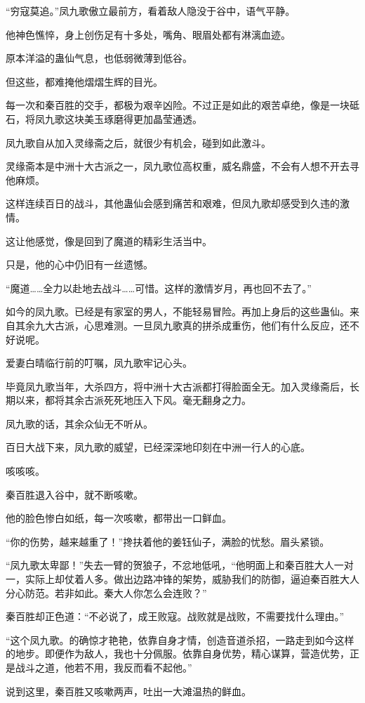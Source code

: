\begin{this_body}
“穷寇莫追。”凤九歌傲立最前方，看着敌人隐没于谷中，语气平静。

他神色憔悴，身上创伤足有十多处，嘴角、眼眉处都有淋漓血迹。

原本洋溢的蛊仙气息，也低弱微薄到低谷。

但这些，都难掩他熠熠生辉的目光。

每一次和秦百胜的交手，都极为艰辛凶险。不过正是如此的艰苦卓绝，像是一块砥石，将凤九歌这块美玉琢磨得更加晶莹通透。

凤九歌自从加入灵缘斋之后，就很少有机会，碰到如此激斗。

灵缘斋本是中洲十大古派之一，凤九歌位高权重，威名鼎盛，不会有人想不开去寻他麻烦。

这样连续百日的战斗，其他蛊仙会感到痛苦和艰难，但凤九歌却感受到久违的激情。

这让他感觉，像是回到了魔道的精彩生活当中。

只是，他的心中仍旧有一丝遗憾。

“魔道……全力以赴地去战斗……可惜。这样的激情岁月，再也回不去了。”

如今的凤九歌。已经是有家室的男人，不能轻易冒险。再加上身后的这些蛊仙。来自其余九大古派，心思难测。一旦凤九歌真的拼杀成重伤，他们有什么反应，还不好说呢。

爱妻白晴临行前的叮嘱，凤九歌牢记心头。

毕竟凤九歌当年，大杀四方，将中洲十大古派都打得脸面全无。加入灵缘斋后，长期以来，都将其余古派死死地压入下风。毫无翻身之力。

凤九歌的话，其余众仙无不听从。

百日大战下来，凤九歌的威望，已经深深地印刻在中洲一行人的心底。

咳咳咳。

秦百胜退入谷中，就不断咳嗽。

他的脸色惨白如纸，每一次咳嗽，都带出一口鲜血。

“你的伤势，越来越重了！”搀扶着他的姜钰仙子，满脸的忧愁。眉头紧锁。

“凤九歌太卑鄙！”失去一臂的贺狼子，不忿地低吼，“他明面上和秦百胜大人一对一，实际上却仗着人多。做出边路冲锋的架势，威胁我们的防御，逼迫秦百胜大人分心防范。若非如此。秦大人你怎么会连败？”

秦百胜却正色道：“不必说了，成王败寇。战败就是战败，不需要找什么理由。”

“这个凤九歌。的确惊才艳艳，依靠自身才情，创造音道杀招，一路走到如今这样的地步。即便作为敌人，我也十分佩服。依靠自身优势，精心谋算，营造优势，正是战斗之道，他若不用，我反而看不起他。”

说到这里，秦百胜又咳嗽两声，吐出一大滩温热的鲜血。


\end{this_body}
